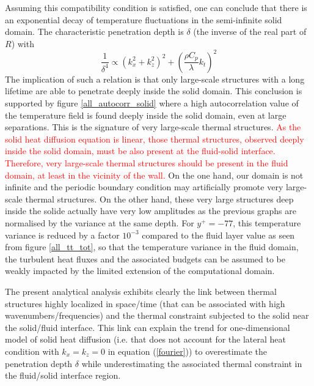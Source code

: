 \documentclass[review]{elsarticle}
\begin{document}
Assuming this compatibility condition is satisfied, one can conclude that there is an exponential decay of temperature fluctuations in the semi-infinite solid domain. The characteristic penetration depth is $\delta$ (the inverse of the real part of $R$) with $$\frac{1}{\delta^4} \propto \left( k_x^2+k_z^2 \right)^2 + \left( \frac{\rho C_p}{\lambda}k_t \right)^2$$ The implication of such a relation is that only large-scale structures with a long lifetime are able to penetrate deeply inside the solid domain. This conclusion is supported by figure \ref{all_autocorr_solid} where a high autocorrelation value of the temperature field is found deeply inside the solid domain, even at large separations. This is the signature of very large-scale thermal structures.
\textcolor{red}{As the solid heat diffusion equation is linear, those thermal structures, observed deeply inside the solid domain, must be also present at the fluid-solid interface.
Therefore, very large-scale thermal structures should be present in the fluid domain, at least in the vicinity of the wall.}
On the one hand, our domain is not infinite and the periodic boundary condition may artificially promote very large-scale thermal structures.
On the other hand, these very large structures deep inside the solide actually have very low amplitudes as the previous graphs are normalised by the variance at the same depth.
For $y^+=-77$, this temperature variance is reduced by a factor $10^{-3}$ compared to the fluid layer value as seen from figure \ref{all_tt_tot}, so that the temperature variance in the fluid domain, the turbulent heat fluxes and the associated budgets can be assumed to be weakly impacted by the limited extension of the computational domain.

The present analytical analysis exhibits clearly the link between thermal structures highly localized in space/time (that can be associated with high wavenumbers/frequencies) and the thermal constraint subjected to the solid near the solid/fluid interface. This link can explain the trend for one-dimensional model of solid heat diffusion (i.e. that does not account for the lateral heat condition with $k_x=k_z=0$ in equation (\ref{fourier})) to overestimate the penetration depth $\delta$ while underestimating the associated thermal constraint in the fluid/solid interface region.
\end{document}
